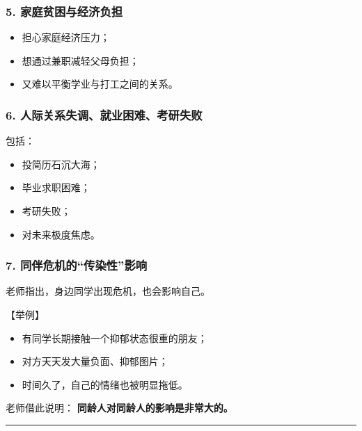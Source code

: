 \documentclass[
  chinese,
  9pt,
  a4paper,
]{ctexart}
\providecommand{\tightlist}{%
  \setlength{\itemsep}{0pt}\setlength{\parskip}{0pt}}
\begin{document}
\subsubsection{5.
家庭贫困与经济负担}\label{ux5bb6ux5eadux8d2bux56f0ux4e0eux7ecfux6d4eux8d1fux62c5}

\begin{itemize}
\tightlist
\item
  担心家庭经济压力；
\item
  想通过兼职减轻父母负担；
\item
  又难以平衡学业与打工之间的关系。
\end{itemize}

\subsubsection{6.
人际关系失调、就业困难、考研失败}\label{ux4ebaux9645ux5173ux7cfbux5931ux8c03ux5c31ux4e1aux56f0ux96beux8003ux7814ux5931ux8d25}

包括：

\begin{itemize}
\tightlist
\item
  投简历石沉大海；
\item
  毕业求职困难；
\item
  考研失败；
\item
  对未来极度焦虑。
\end{itemize}

\subsubsection{7.
同伴危机的``传染性''影响}\label{ux540cux4f34ux5371ux673aux7684ux4f20ux67d3ux6027ux5f71ux54cd}

老师指出，身边同学出现危机，也会影响自己。

【举例】

\begin{itemize}
\tightlist
\item
  有同学长期接触一个抑郁状态很重的朋友；
\item
  对方天天发大量负面、抑郁图片；
\item
  时间久了，自己的情绪也被明显拖低。
\end{itemize}

老师借此说明： \textbf{同龄人对同龄人的影响是非常大的。}

\begin{center}\rule{0.5\linewidth}{0.5pt}\end{center}
\end{document}
